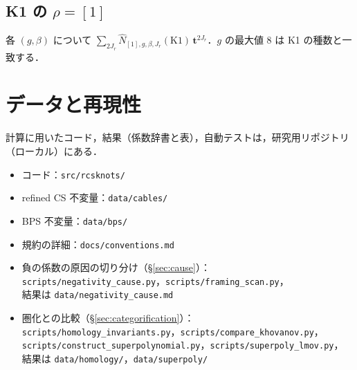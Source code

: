 \documentclass[11pt,a4paper]{ltjsarticle}
\theoremstyle{definition}
\theoremstyle{remark}
\newcommand{\bt}{\mathbf{t}}
\newcommand{\hN}{\widehat{N}}
\begin{document}
\begin{landscape}
\section{K1 の $\rho=[1]$}\label{app:K1}
\begin{center}
\tiny

\end{center}
各 $(g,\beta)$ について $\sum_{2J_r}\hN_{[1],g,\beta,J_r}(\mathrm{K1})\,\bt^{2J_r}$．$g$ の最大値 8 は K1 の種数と一致する．
\end{landscape}

\section{データと再現性}

計算に用いたコード，結果（係数辞書と表），自動テストは，研究用リポジトリ（ローカル）にある．
\begin{itemize}
\item コード：\texttt{src/rcsknots/}
\item refined CS 不変量：\texttt{data/cables/}
\item BPS 不変量：\texttt{data/bps/}
\item 規約の詳細：\texttt{docs/conventions.md}
\item 負の係数の原因の切り分け（\S\ref{sec:cause}）：\\ \texttt{scripts/negativity\_cause.py}，\texttt{scripts/framing\_scan.py}，\\ 結果は \texttt{data/negativity\_cause.md}
\item 圏化との比較（\S\ref{sec:categorification}）：\\ \texttt{scripts/homology\_invariants.py}，\texttt{scripts/compare\_khovanov.py}，\\ \texttt{scripts/construct\_superpolynomial.py}，\texttt{scripts/superpoly\_lmov.py}，\\ 結果は \texttt{data/homology/}，\texttt{data/superpoly/}
\end{itemize}
\end{document}
